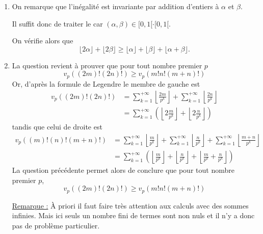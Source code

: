 \begin{sol}
\begin{enumerate}
\item On remarque que l'inégalité est invariante par addition d'entiers à $\alpha$ et $\beta$.

Il suffit donc de traiter le car $(\alpha,\beta) \in [0,1[ \cdot [0,1[$.

On vérifie alors que
$$\boxed{\lfloor 2 \alpha \rfloor  + \lfloor  2\beta\rfloor \ge \lfloor \alpha \rfloor + \lfloor \beta \rfloor + \lfloor \alpha + \beta \rfloor}. $$
\item La question revient à prouver que pour tout nombre premier $p$
$$v_p \left((2m)! (2n)! \right) \ge v_p\left( m! n! (m + n)!\right)$$
Or, d'après la formule de Legendre le membre de gauche est
$$\begin{aligned}
  v_p \left((2m)! (2n)! \right) & = \sum_{k = 1}^{ + \infty} \left\lfloor \frac{2m}{p^k} \right\rfloor + \sum_{k = 1}^{ + \infty} \left\lfloor \frac{2n}{p^k} \right\rfloor\\
  & = \sum_{k = 1}^{ + \infty} \left(\left\lfloor 2 \frac m{p^k} \right\rfloor + \left\lfloor 2 \frac n{p^k} \right\rfloor\right)
\end{aligned}$$
tandis que celui de droite est
$$\begin{aligned}
  v_p \left((m)! (n)!(m + n)! \right) & = \sum_{k = 1}^{ + \infty} \left\lfloor \frac m{p^k} \right\rfloor + \sum_{k = 1}^{ + \infty} \left\lfloor \frac n{p^k} \right\rfloor + \sum_{k = 1}^{ + \infty} \left\lfloor \frac{m + n}{p^k} \right\rfloor\\
  & = \sum_{k = 1}^{ + \infty} \left(\left\lfloor  \frac m{p^k} \right\rfloor + \left\lfloor \frac n{p^k} \right\rfloor + \left\lfloor \frac m{p^k} + \frac n{p^k} \right\rfloor\right)
\end{aligned}$$
La question précédente permet alors de conclure que pour tout nombre premier $p$,
$$\boxed{v_p \left((2m)! (2n)! \right) \ge v_p\left( m! n! (m + n)!\right)}$$

\underline{Remarque :} À priori il faut faire très attention aux calculs avec des sommes infinies. Mais ici seuls {un nombre fini de termes sont non nuls} et il n'y a donc pas de problème particulier.
\end{enumerate}
\end{sol}


